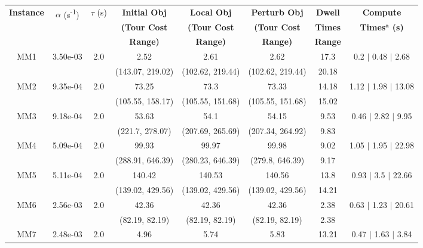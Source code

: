 \begin{longtable}{|c|c|c|c|c|c|c|c|}\hline
	\multirow{3}{*}{\textbf{Instance}} & \multirow{3}{*}{$\alpha$ (s\textsuperscript{-1})} & \multirow{3}{*}{$\tau$ (s)} & {\textbf{Initial Obj}} & {\textbf{Local Obj}} & {\textbf{Perturb Obj}} & {\textbf{Dwell}} & {\textbf{Compute}} \\
	 & & & {\textbf{(Tour Cost}} & {\textbf{(Tour Cost}} & {\textbf{(Tour Cost}} & {\textbf{Times}} & {\textbf{Times$^{\mathrm{\boldsymbol{a}}}$ (s)}} \\
	 & & & {\textbf{Range)}} & {\textbf{Range)}} & {\textbf{Range)}} & {\textbf{Range}} & \\
	\hline \hline
	\multirow{2}{*}{MM1} & \multirow{2}{*}{3.50e-03} & \multirow{2}{*}{2.0} & 2.52 & 2.61 & 2.62 & 17.3 & 0.2 $\mid$ 0.48 $\mid$ 2.68\\
	 &  &  & (143.07, 219.02) & (102.62, 219.44) & (102.62, 219.44) & 20.18 & \\
 	\hline
	\multirow{2}{*}{MM2} & \multirow{2}{*}{9.35e-04} & \multirow{2}{*}{2.0} & 73.25 & 73.3 & 73.33 & 14.18 & 1.12 $\mid$ 1.98 $\mid$ 13.08\\
	 &  &  & (105.55, 158.17) & (105.55, 151.68) & (105.55, 151.68) & 15.02 & \\
 	\hline
	\multirow{2}{*}{MM3} & \multirow{2}{*}{9.18e-04} & \multirow{2}{*}{2.0} & 53.63 & 54.1 & 54.15 & 9.53 & 0.46 $\mid$ 2.82 $\mid$ 9.95\\
	 &  &  & (221.7, 278.07) & (207.69, 265.69) & (207.34, 264.92) & 9.83 & \\
 	\hline
	\multirow{2}{*}{MM4} & \multirow{2}{*}{5.09e-04} & \multirow{2}{*}{2.0} & 99.93 & 99.97 & 99.98 & 9.02 & 1.05 $\mid$ 1.95 $\mid$ 22.98\\
	 &  &  & (288.91, 646.39) & (280.23, 646.39) & (279.8, 646.39) & 9.17 & \\
 	\hline
	\multirow{2}{*}{MM5} & \multirow{2}{*}{5.11e-04} & \multirow{2}{*}{2.0} & 140.42 & 140.53 & 140.56 & 13.8 & 0.93 $\mid$ 3.5 $\mid$ 22.66\\
	 &  &  & (139.02, 429.56) & (139.02, 429.56) & (139.02, 429.56) & 14.21 & \\
 	\hline
	\multirow{2}{*}{MM6} & \multirow{2}{*}{2.56e-03} & \multirow{2}{*}{2.0} & 42.36 & 42.36 & 42.36 & 2.38 & 0.63 $\mid$ 1.23 $\mid$ 20.61\\
	 &  &  & (82.19, 82.19) & (82.19, 82.19) & (82.19, 82.19) & 2.38 & \\
 	\hline
	\multirow{2}{*}{MM7} & \multirow{2}{*}{2.48e-03} & \multirow{2}{*}{2.0} & 4.96 & 5.74 & 5.83 & 13.21 & 0.47 $\mid$ 1.63 $\mid$ 3.84\\

\end{longtable}

